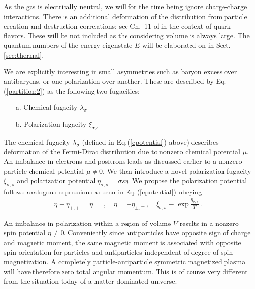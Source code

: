 \documentclass[aps,prd,floatfix,reprint]{revtex4-2}
\newcommand{\req}[1]{Eq.\,(\ref{#1})}
\newcommand{\rsec}[1]{Sect.\,{\ref{#1}}}
\begin{document}
As the gas is electrically neutral, we will for the time being ignore charge-charge interactions. There is an additional deformation of the distribution from particle creation and destruction correlations; see Ch.~11 of \cite{Letessier:2002ony} in the context of quark flavors. These will be not included as the considering volume is always large. The quantum numbers of the energy eigenstate $E$ will be elaborated on in \rsec{sec:thermal}.

We are explicitly interesting in small asymmetries such as baryon excess over antibaryons, or one polarization over another. These are described by \req{partition:2} as the following two fugacities:
\begin{itemize}
 \item[a.] Chemical fugacity $\lambda_{\sigma}$
 \item[b.] Polarization fugacity $\xi_{\sigma,s}$
\end{itemize}
The chemical fugacity $\lambda_{\sigma}$ (defined in \req{cpotential} above) describes deformation of the Fermi-Dirac distribution due to nonzero chemical potential $\mu$. An imbalance in electrons and positrons leads as discussed earlier to a nonzero particle chemical potential $\mu\neq0$. We then introduce a novel polarization fugacity $\xi_{\sigma,s}$ and polarization potential $\eta_{\sigma,s}=\sigma s\eta$. We propose the polarization potential follows analogous expressions as seen in \req{cpotential} obeying
\begin{align}
 \label{spotential}
 \eta\equiv\eta_{+,+}=\eta_{-,-}\,,\quad\eta=-\eta_{\pm,\mp}\,,\quad\xi_{\sigma,s}\equiv\exp{\frac{\eta_{\sigma,s}}{T}}\,.
\end{align}

An imbalance in polarization within a region of volume $V$ results in a nonzero spin potential $\eta\neq0$. Conveniently since antiparticles have opposite sign of charge and magnetic moment, the same magnetic moment is associated with opposite spin orientation for particles and antiparticles independent of degree of spin-magnetization. A completely particle-antiparticle symmetric magnetized plasma will have therefore zero total angular momentum. This is of course very different from the situation today of a matter dominated universe.

\end{document}
